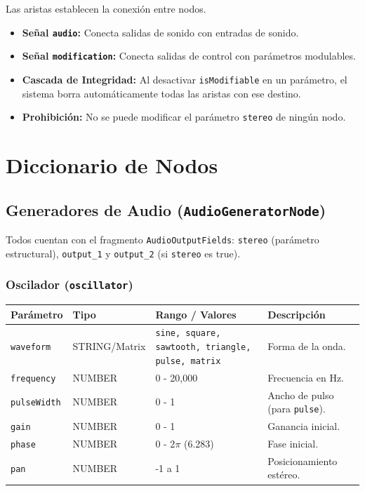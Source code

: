 Las aristas establecen la conexión entre nodos.

\begin{itemize}
    \item \textbf{Señal \texttt{audio}:} Conecta salidas de sonido con entradas de sonido.
    \item \textbf{Señal \texttt{modification}:} Conecta salidas de control con parámetros modulables.
    \item \textbf{Cascada de Integridad:} Al desactivar \texttt{isModifiable} en un parámetro, el sistema borra automáticamente todas las aristas con ese destino.
    \item \textbf{Prohibición:} No se puede modificar el parámetro \texttt{stereo} de ningún nodo.
\end{itemize}

\section{Diccionario de Nodos}

\subsection{Generadores de Audio (\texttt{AudioGeneratorNode})}

Todos cuentan con el fragmento \texttt{AudioOutputFields}: \texttt{stereo} (parámetro estructural), \texttt{output\_1} y \texttt{output\_2} (si \texttt{stereo} es true).

\subsubsection{Oscilador (\texttt{oscillator})}

\begin{table}[H]
\centering
\small
\begin{tabular}{@{}llp{3cm}p{4cm}@{}}
\toprule
Parámetro & Tipo & Rango / Valores & Descripción \\ \midrule
\texttt{waveform} & STRING/Matrix & \texttt{sine, square, sawtooth, triangle, pulse, matrix} & Forma de la onda. \\
\texttt{frequency} & NUMBER & 0 - 20,000 & Frecuencia en Hz. \\
\texttt{pulseWidth} & NUMBER & 0 - 1 & Ancho de pulso (para \texttt{pulse}). \\
\texttt{gain} & NUMBER & 0 - 1 & Ganancia inicial. \\
\texttt{phase} & NUMBER & 0 - 2$\pi$ (6.283) & Fase inicial. \\
\texttt{pan} & NUMBER & -1 a 1 & Posicionamiento estéreo. \\ \bottomrule
\end{tabular}
\end{table}

